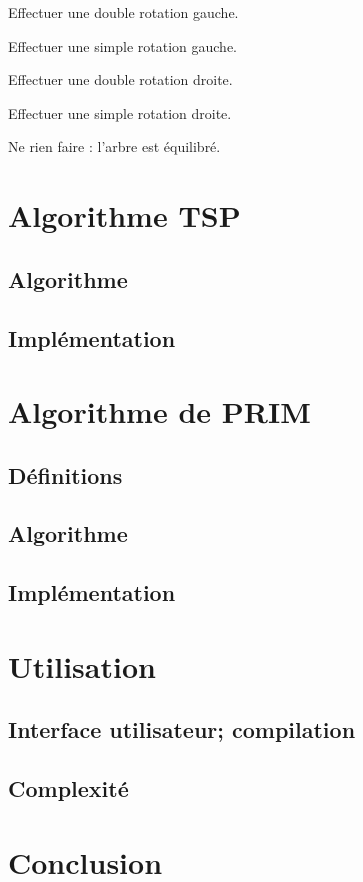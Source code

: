 \documentclass{article}
\begin{document}
\begin{algorithmic}


Effectuer une double rotation gauche.
\Else

Effectuer une simple rotation gauche.

\EndIf
{}


Effectuer une double rotation droite.
\Else

Effectuer une simple rotation droite.
\EndIf
\Else

Ne rien faire : l'arbre est équilibré.
\EndIf
\end{algorithmic}

\section{Algorithme TSP}

\subsection{Algorithme}

\subsection{Implémentation}

\section{Algorithme de PRIM}

\subsection{Définitions}

\subsection{Algorithme}

\subsection{Implémentation}

\section{Utilisation}

\subsection{Interface utilisateur; compilation}

\subsection{Complexité}

\section*{Conclusion}



\end{document}
